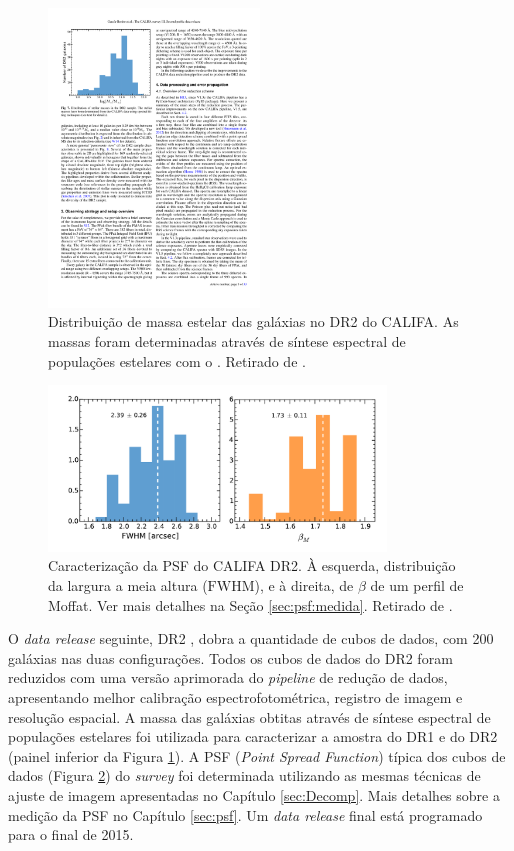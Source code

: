 \begin{figure}
	\includegraphics[width=0.5\textwidth]{figuras/CALIFAMass}
	\caption[Distribuição de massa das galáxias no  DR2 do CALIFA.]
	{Distribuição de massa estelar das galáxias no DR2 do CALIFA. As massas
	foram determinadas através de síntese espectral de populações estelares com o
	\starlight. Retirado de \citet{GarciaBenito2015}.}
	\label{fig:DRMass}
\end{figure}

\begin{figure}
	\includegraphics[width=0.8\textwidth]{figuras/DR2PSF}
	\caption[Caracterização da PSF do CALIFA DR2.]
	{Caracterização da PSF do CALIFA DR2. À esquerda, distribuição da largura a
	meia altura ($\mathrm{FWHM}$), e à direita, de $\beta$ de um perfil de Moffat.
	Ver mais detalhes na Seção \ref{sec:psf:medida}. Retirado de
	\citet{GarciaBenito2015}.}
	\label{fig:DR2PSF}
\end{figure}

O {\em data release} seguinte, DR2 \citep{GarciaBenito2015}, dobra a quantidade
de cubos de dados, com 200 galáxias nas duas configurações. Todos os cubos de
dados do DR2 foram reduzidos com uma versão aprimorada do {\em pipeline} de
redução de dados, apresentando melhor calibração espectrofotométrica, registro
de imagem e resolução espacial. A massa das galáxias obtitas através de síntese
espectral de populações estelares foi utilizada para caracterizar a amostra do
DR1 e do DR2 (painel inferior da Figura \ref{fig:DRMass}).
A PSF ({\em Point Spread Function}) típica dos cubos de dados (Figura
\ref{fig:DR2PSF}) do {\em survey} foi determinada utilizando as mesmas técnicas
de ajuste de imagem apresentadas no Capítulo \ref{sec:Decomp}. Mais detalhes
sobre a medição da PSF no Capítulo \ref{sec:psf}. Um {\em data release} final
está programado para o final de 2015.


